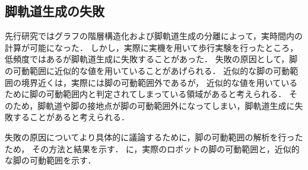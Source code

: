 \subsection{脚軌道生成の失敗}
先行研究ではグラフの階層構造化および脚軌道生成の分離によって，実時間内の計算が可能になった．
しかし，実際に実機を用いて歩行実験を行ったところ，低頻度ではあるが脚軌道生成に失敗することがあった．
失敗の原因として，脚の可動範囲に近似的な値を用いていることがあげられる．
近似的な脚の可動範囲の境界近くは，実際には脚の可動範囲外であるが，
近似的な値を用いているために脚の可動範囲内と判定されてしまっている領域があると考えられる．
そのため，脚軌道や脚の接地点が脚の可動範囲外になってしまい，脚軌道生成に失敗することがあると考えられる．

失敗の原因についてより具体的に議論するために，脚の可動範囲の解析を行ったため，
その方法と結果を示す．
に，実際のロボットの脚の可動範囲と，近似的な脚の可動範囲を示す．

